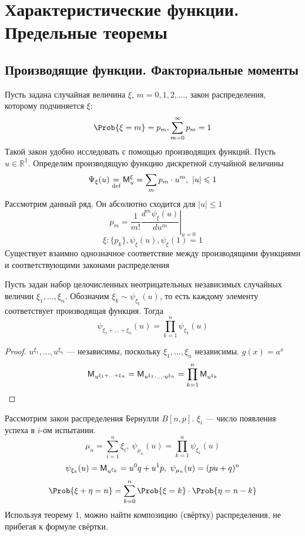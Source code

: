 \chapter{Характеристические функции. Предельные теоремы}
\setcounter{equation}{0}
\section{Производящие функции. Факториальные моменты}
Пусть задана случайная величина $\xi$, $m = 0, 1, 2, \ldots$, закон распределения, которому подчиняется $\xi$: 
\[
	\Prob \{ \xi = m \} = p_m, \sum\limits_{m = 0}^{\infty} p_m = 1
\]
Такой закон удобно исследовать с помощью производящих функций. Пусть $u \in \mathbb{R}^1$. Определим производящую функцию дискретной случайной величины
\begin{equation}
	\Psi_{\xi} (u) \underset{\textrm{def} }{=} \mathsf{M}_u^{\xi} = \sum\limits_{m} p_m \cdot u^m, \ |u| \leqslant 1
\end{equation}
Рассмотрим данный ряд. Он абсолютно сходится для $|u| \leqslant 1$
\begin{equation}
	p_m = \frac{1}{m!} \left. \frac{d^m \psi_{\xi} (u)}{du^{m}} \right|_{u = 0}
\end{equation}
\[
	\xi : \{ p_k \}, \psi_{\xi} (u), \psi_{\xi}(1) = 1
\]
Существует взаимно однозначное соответствие между производящими функциями и соответствующими законами распределения
\begin{theorem}
	Пусть задан набор целочисленных неотрицательных независимых случайных величин $\xi_1, \ldots, \xi_n$. Обозначим $\xi_k \sim \psi_{\xi_k} (u)$, то есть каждому элементу соответствует производящая функция. Тогда
\[
	\psi_{\xi_1 + \ldots + \xi_n} (u) = \prod\limits_{k = 1}^{n} \psi_{\xi_k} (u)
\]
\end{theorem}
\begin{proof}
	$u^{\xi_1}, \ldots, u^{\xi_n}$ --- независимы, поскольку $\xi_1, \ldots, \xi_n$ независимы. $g(x) = a^x$
\[
	\mathsf{M}_{u^{\xi_1 + \ldots + \xi_n}} = \mathsf{M}_{u^{\xi_1} \cdot \ldots \cdot u^{\xi_n}} = \prod\limits_{k = 1}^{n} \mathsf{M}_{u^{\xi_k}}
\]
\end{proof}
\begin{example}
	Рассмотрим закон распределения Бернулли $B[n, p]$. $\xi_i$ --- число появления успеха в $i$-ом испытании.
\[
	\mu_n = \sum\limits_{i = 1}^{n} \xi_i, \ \psi_{\mu_n} (u) = \prod\limits_{k = 1}^{n} \psi_{\xi_k} (u)
\]
\[
	\psi_{\xi_k} (u) = \mathsf{M}_{u^{\xi_k}} = u^0 q + u^1 p, \ \psi_{\mu_n} (u) = (pu + q)^n
\]
\[
	\Prob \{ \xi + \eta = n \} = \sum\limits_{k = 0}^{n} \Prob \{ \xi = k \} \cdot \Prob \{ \eta = n - k \}
\]
Используя теорему 1, можно найти композицию (свёртку) распределения, не прибегая к формуле свёртки.
\end{example}

